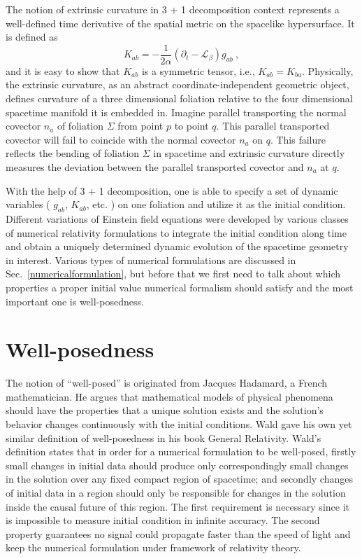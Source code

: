 The notion of extrinsic curvature in 3 + 1 decomposition context represents a well-defined time derivative of the spatial metric on the spacelike hypersurface. It is defined as
\begin{equation}\label{extrinsic}
K_{ab} = - \frac{1}{2\alpha}(\partial_{t} - \mathcal{L}_{\beta})g_{ab} \ ,
\end{equation}
and it is easy to show that $K_{ab}$ is a symmetric tensor, i.e., $K_{ab} = K_{ba}$. Physically, the extrinsic curvature, as an abstract coordinate-independent geometric object, defines curvature of a three dimensional foliation relative to the four dimensional spacetime manifold it is embedded in. Imagine parallel transporting the normal covector $n_{a}$ of foliation $\Sigma$ from point $p$ to point $q$. This parallel transported covector will fail to coincide with the normal covector $n_{a}$ on $q$. This failure reflects the bending of foliation $\Sigma$ in spacetime and extrinsic curvature directly measures the deviation between the parallel transported covector and $n_{a}$ at $q$. 

With the help of 3 + 1 decomposition, one is able to specify a set of dynamic variables ( $g_{ab}$, $K_{ab}$, etc. ) on one foliation and utilize it as the initial condition. Different variations of Einstein field equations were developed by various classes of numerical relativity formulations to integrate the initial condition along time and obtain a uniquely determined dynamic evolution of the spacetime geometry in interest. Various types of  numerical formulations are discussed in Sec.~\ref{numericalformulation}, but before that we first need to talk about which properties a proper initial value numerical formalism should satisfy and the most important one is well-posedness.  
\section{Well-posedness}\label{wellposedness}
The notion of ``well-posed'' is originated from Jacques Hadamard, a French mathematician. He argues that mathematical models of physical phenomena should have the properties that a unique solution exists and the solution's behavior changes continuously with the initial conditions. Wald gave his own yet similar definition of well-posedness in his book General Relativity\cite{Wald:GRbook}. Wald's definition states that in order for a numerical formulation to be well-posed, firstly small changes in initial data should produce only correspondingly small changes in the solution over any fixed compact region of spacetime; and secondly changes of initial data in a region should only be responsible for changes in the solution inside the causal future of this region. The first requirement is necessary since it is impossible to measure initial condition in infinite accuracy. The second property guarantees no signal could propagate faster than the speed of light and keep the numerical formulation under framework of relativity theory. 

